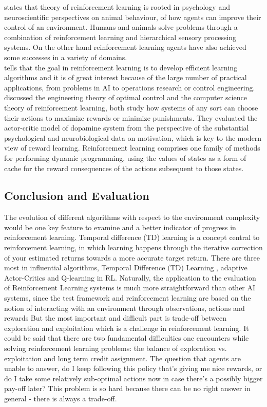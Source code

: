 \documentclass[12pt,a4paper]{article}
\begin{document}
{\cite{jaderberg2016reinforcement} states that theory of reinforcement learning is rooted in psychology and neuroscientific perspectives on animal behaviour, of how agents can improve their control of an environment. Humans and animals solve problems through a combination of reinforcement learning and hierarchical sensory processing systems. On the other hand reinforcement learning agents have also achieved some successes in a variety of domains.\\
\cite{wiering2012reinforcement} tells that the goal in reinforcement learning is to develop efficient learning algorithms and it is of great interest because of the large number of practical applications, from problems in AI to operations research or control engineering.\\
\cite{dayan2002reward} discussed the engineering theory of optimal control and the computer science theory of reinforcement learning, both study how systems of any sort can choose their actions to maximize rewards or minimize punishments. They evaluated the actor-critic model of dopamine system from the perspective of the substantial psychological and neurobiological data on motivation, which is key to the modern view of reward learning. Reinforcement learning comprises one family of methods for performing dynamic programming, using the values of states as a form of cache for the reward consequences of the actions subsequent to those states.\\
\subsection{Conclusion and Evaluation}
The evolution of different algorithms with respect to the environment complexity would be one key feature to
examine and a better indicator of progress in reinforcement learning. Temporal difference (TD) learning is a concept central to reinforcement learning, in which learning happens through the iterative correction of your estimated returns towards a more accurate target return. There are 
three most in
influential algorithms, Temporal Difference
(TD) Learning , adaptive Actor-Critics and Q-learning in RL.
Naturally, the application to the evaluation of Reinforcement Learning systems is much more
straightforward than other AI systems, since the test framework and reinforcement learning are based on the notion of interacting with an environment through
observations, actions and rewards But the most important and difficult part is trade-off between exploration and exploitation which is a challenge in reinforcement learning. It could be said that there are two fundamental difficulties one encounters while solving reinforcement learning problems: the balance of exploration vs. exploitation and long term credit assignment. The question that agents are unable to answer, do I keep following this policy that’s giving me nice rewards, or do I take some relatively sub-optimal actions now in case there’s a possibly bigger pay-off later? This problem is so hard because there can be no right answer in general - there is always a trade-off.

}
\end{document}
